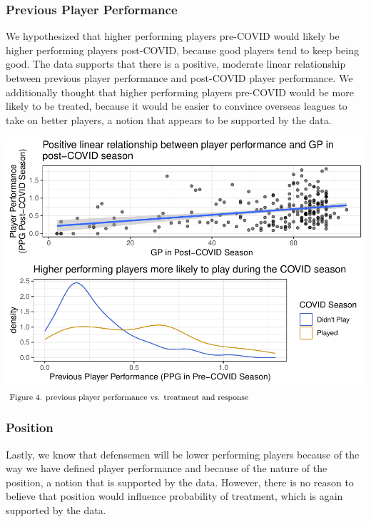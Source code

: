 \documentclass[12pt]{article}
\begin{document}
\hypertarget{previous-player-performance}{%
\subsubsection{Previous Player
Performance}\label{previous-player-performance}}

We hypothesized that higher performing players pre-COVID would likely be
higher performing players post-COVID, because good players tend to keep
being good. The data supports that there is a positive, moderate linear
relationship between previous player performance and post-COVID player
performance. We additionally thought that higher performing players
pre-COVID would be more likely to be treated, because it would be easier
to convince overseas leagues to take on better players, a notion that
appears to be supported by the data.

\includegraphics{journal-article_files/figure-latex/ppp-plots-1.pdf}
\(\hspace*{\fill} \footnotesize \text{Figure 4. previous player performance vs. treatment and response}\)

\hypertarget{position}{%
\subsubsection{Position}\label{position}}

Lastly, we know that defensemen will be lower performing players because
of the way we have defined player performance and because of the nature
of the position, a notion that is supported by the data. However, there
is no reason to believe that position would influence probability of
treatment, which is again supported by the data.
\end{document}
